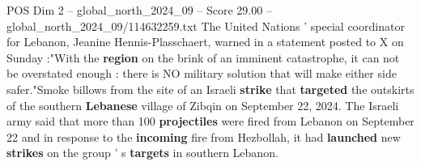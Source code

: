 \begin{textsample}{POS Dim 2 – global\_north\_2024\_09 – Score 29.00 – global\_north\_2024\_09/114632259.txt}
The United Nations ' special coordinator for Lebanon, Jeanine Hennis-Plasschaert, warned in a statement posted to X on Sunday :"With the \textbf{region} on the brink of an imminent catastrophe, it can not be overstated enough : there is NO military solution that will make either side safer."Smoke billows from the site of an Israeli \textbf{strike} that \textbf{targeted} the outskirts of the southern \textbf{Lebanese} village of Zibqin on September 22, 2024.
The Israeli army said that more than 100 \textbf{projectiles} were fired from Lebanon on September 22 and in response to the \textbf{incoming} fire from Hezbollah, it had \textbf{launched} new \textbf{strikes} on the group ' s \textbf{targets} in southern Lebanon.

\end{textsample}
